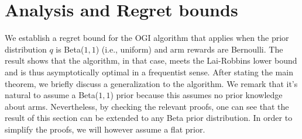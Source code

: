 \section{Analysis and Regret bounds} \label{sec:analysis_of_regret}
We establish a regret bound for the OGI algorithm that applies when the prior distribution $q$ is Beta($1,1$) (i.e., uniform) and arm rewards are Bernoulli. The result shows that the algorithm, in that case, meets the Lai-Robbins lower bound and is thus asymptotically optimal in a frequentist sense. After stating the main theorem, we briefly discuss a generalization to the algorithm.  {\color{blue}We remark that it's natural to assume a Beta($1,1$) prior because this assumes no prior knowledge about  arms. Nevertheless, by checking the relevant proofs, one can see that the  result of this section can be extended to any Beta prior distribution. In order to simplify the proofs, we will however assume a flat prior.} 

